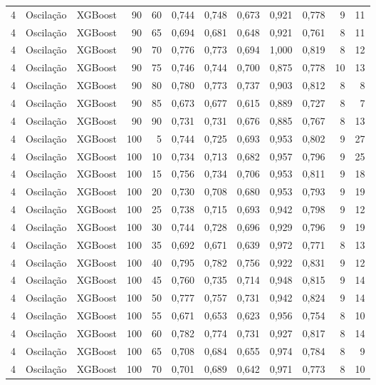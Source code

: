 \begin{longtable}{@{}rllrrrrrrrrr@{}}
4 & Oscilação & XGBoost & 90 & 60 & 0,744 & 0,748 & 0,673 & 0,921 & 0,778 & 9 & 11 \\
4 & Oscilação & XGBoost & 90 & 65 & 0,694 & 0,681 & 0,648 & 0,921 & 0,761 & 8 & 11 \\
4 & Oscilação & XGBoost & 90 & 70 & 0,776 & 0,773 & 0,694 & 1,000 & 0,819 & 8 & 12 \\
4 & Oscilação & XGBoost & 90 & 75 & 0,746 & 0,744 & 0,700 & 0,875 & 0,778 & 10 & 13 \\
4 & Oscilação & XGBoost & 90 & 80 & 0,780 & 0,773 & 0,737 & 0,903 & 0,812 & 8 & 8 \\
4 & Oscilação & XGBoost & 90 & 85 & 0,673 & 0,677 & 0,615 & 0,889 & 0,727 & 8 & 7 \\
4 & Oscilação & XGBoost & 90 & 90 & 0,731 & 0,731 & 0,676 & 0,885 & 0,767 & 8 & 13 \\
4 & Oscilação & XGBoost & 100 & 5 & 0,744 & 0,725 & 0,693 & 0,953 & 0,802 & 9 & 27 \\
4 & Oscilação & XGBoost & 100 & 10 & 0,734 & 0,713 & 0,682 & 0,957 & 0,796 & 9 & 25 \\
4 & Oscilação & XGBoost & 100 & 15 & 0,756 & 0,734 & 0,706 & 0,953 & 0,811 & 9 & 18 \\
4 & Oscilação & XGBoost & 100 & 20 & 0,730 & 0,708 & 0,680 & 0,953 & 0,793 & 9 & 19 \\
4 & Oscilação & XGBoost & 100 & 25 & 0,738 & 0,715 & 0,693 & 0,942 & 0,798 & 9 & 12 \\
4 & Oscilação & XGBoost & 100 & 30 & 0,744 & 0,728 & 0,696 & 0,929 & 0,796 & 9 & 19 \\
4 & Oscilação & XGBoost & 100 & 35 & 0,692 & 0,671 & 0,639 & 0,972 & 0,771 & 8 & 13 \\
4 & Oscilação & XGBoost & 100 & 40 & 0,795 & 0,782 & 0,756 & 0,922 & 0,831 & 9 & 12 \\
4 & Oscilação & XGBoost & 100 & 45 & 0,760 & 0,735 & 0,714 & 0,948 & 0,815 & 9 & 14 \\
4 & Oscilação & XGBoost & 100 & 50 & 0,777 & 0,757 & 0,731 & 0,942 & 0,824 & 9 & 14 \\
4 & Oscilação & XGBoost & 100 & 55 & 0,671 & 0,653 & 0,623 & 0,956 & 0,754 & 8 & 10 \\
4 & Oscilação & XGBoost & 100 & 60 & 0,782 & 0,774 & 0,731 & 0,927 & 0,817 & 8 & 14 \\
4 & Oscilação & XGBoost & 100 & 65 & 0,708 & 0,684 & 0,655 & 0,974 & 0,784 & 8 & 9 \\
4 & Oscilação & XGBoost & 100 & 70 & 0,701 & 0,689 & 0,642 & 0,971 & 0,773 & 8 & 10 \\

\end{longtable}
